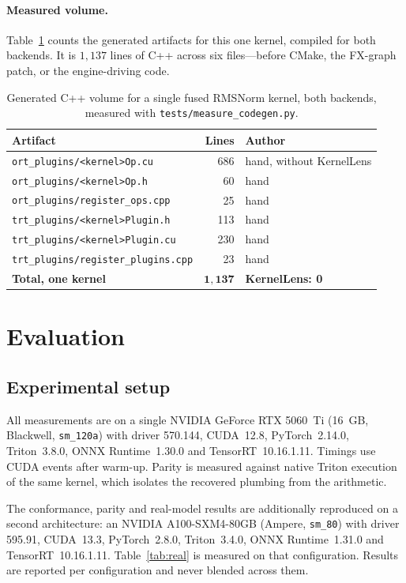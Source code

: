 \documentclass{article}
\begin{document}
\paragraph{Measured volume.} Table~\ref{tab:loc} counts the generated artifacts
for this one kernel, compiled for both backends. It is $1{,}137$ lines of
C++ across six files---before CMake, the FX-graph patch, or the engine-driving
code.

\begin{table}[t]
\centering
\small
\begin{tabular}{l r l}
\toprule
\textbf{Artifact} & \textbf{Lines} & \textbf{Author} \\ \midrule
\texttt{ort\_plugins/<kernel>Op.cu} & 686 & hand, without KernelLens \\
\texttt{ort\_plugins/<kernel>Op.h} & 60 & hand \\
\texttt{ort\_plugins/register\_ops.cpp} & 25 & hand \\
\texttt{trt\_plugins/<kernel>Plugin.h} & 113 & hand \\
\texttt{trt\_plugins/<kernel>Plugin.cu} & 230 & hand \\
\texttt{trt\_plugins/register\_plugins.cpp} & 23 & hand \\ \midrule
\textbf{Total, one kernel} & $\mathbf{1{,}137}$ & \textbf{KernelLens: 0} \\
\bottomrule
\end{tabular}
\caption{Generated C++ volume for a single fused RMSNorm kernel, both backends,
measured with \texttt{tests/measure\_codegen.py}.}
\label{tab:loc}
\end{table}

\section{Evaluation}
\label{sec:eval}

\subsection{Experimental setup}

All measurements are on a single NVIDIA GeForce RTX 5060~Ti (16~GB, Blackwell,
\texttt{sm\_120a}) with driver 570.144, CUDA~12.8, PyTorch~2.14.0, Triton~3.8.0,
ONNX Runtime~1.30.0 and TensorRT~10.16.1.11. Timings use CUDA events after
warm-up. Parity is measured against native Triton execution of the same kernel,
which isolates the recovered plumbing from the arithmetic.

The conformance, parity and real-model results are additionally reproduced on a
second architecture: an NVIDIA A100-SXM4-80GB (Ampere, \texttt{sm\_80}) with
driver 595.91, CUDA~13.3, PyTorch~2.8.0, Triton~3.4.0, ONNX
Runtime~1.31.0 and TensorRT~10.16.1.11. Table~\ref{tab:real} is measured on
that configuration. Results are reported per configuration and never blended
across them.
\end{document}
